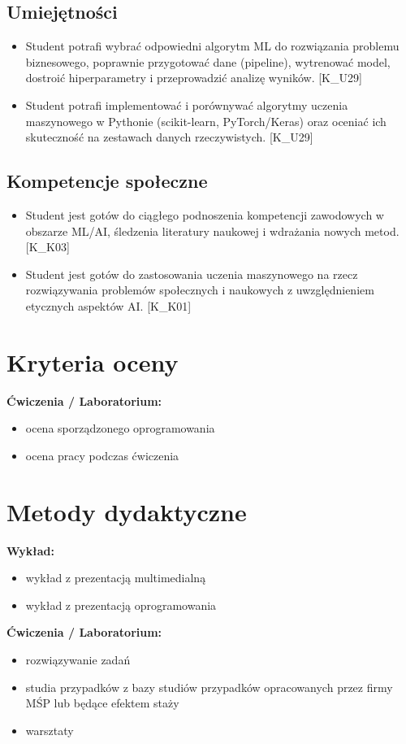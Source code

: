\documentclass[12pt, a4paper]{article}
\begin{document}
\subsection*{Umiejętności}
\begin{itemize}
  \item Student potrafi wybrać odpowiedni algorytm ML do rozwiązania problemu biznesowego, poprawnie przygotować dane (pipeline), wytrenować model, dostroić hiperparametry i przeprowadzić analizę wyników. [K\_U29]
  \item Student potrafi implementować i porównywać algorytmy uczenia maszynowego w Pythonie (scikit-learn, PyTorch/Keras) oraz oceniać ich skuteczność na zestawach danych rzeczywistych. [K\_U29]
\end{itemize}

\subsection*{Kompetencje społeczne}
\begin{itemize}
  \item Student jest gotów do ciągłego podnoszenia kompetencji zawodowych w obszarze ML/AI, śledzenia literatury naukowej i wdrażania nowych metod. [K\_K03]
  \item Student jest gotów do zastosowania uczenia maszynowego na rzecz rozwiązywania problemów społecznych i naukowych z uwzględnieniem etycznych aspektów AI. [K\_K01]
\end{itemize}

\section{Kryteria oceny}

\textbf{Ćwiczenia / Laboratorium:}
\begin{itemize}
  \item ocena sporządzonego oprogramowania
  \item ocena pracy podczas ćwiczenia
\end{itemize}


\section{Metody dydaktyczne}

\textbf{Wykład:}
\begin{itemize}
  \item wykład z prezentacją multimedialną
  \item wykład z prezentacją oprogramowania
\end{itemize}
\vspace{4pt}
\textbf{Ćwiczenia / Laboratorium:}
\begin{itemize}
  \item rozwiązywanie zadań
  \item studia przypadków z bazy studiów przypadków opracowanych przez firmy MŚP lub będące efektem staży
  \item warsztaty
\end{itemize}
\vspace{4pt}
\end{document}
